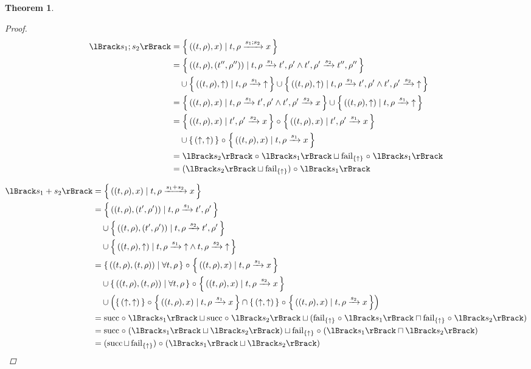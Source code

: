 \documentclass{article}
\newtheorem{theorem}{Theorem}
\newcommand{\fail}{\ensuremath \text{$\uparrow$}}
\newcommand{\seq}[2]{\ensuremath #1 ; #2}
\newcommand{\choice}[2]{\ensuremath #1 + #2}
\newcommand{\transform}[5]{#1, #2 \xrightarrow{#3} #4, #5}
\newcommand{\transformx}[4]{#1, #2 \xrightarrow{#3} #4}
\newcommand{\transformfail}[3]{#1, #2 \xrightarrow{#3} \fail}
\newcommand{\sem}[1]{\ensuremath \lBrack #1 \rBrack}
\newcommand{\setbuild}[2]{\ensuremath \left\{\, #1 \mid #2 \,\right\}}
\newcommand{\setbuildc}[1]{\ensuremath \left\{\, #1 \,\right\}}
\newcommand{\lfail}{\ensuremath \operatorname{fail}}
\newcommand{\lsucc}{\ensuremath \operatorname{succ}}
\newcommand{\comp}{\ensuremath \mathrel{\circ}}
\begin{document}
\begin{theorem}
\begin{proof}
\begin{align*}
  \sem{\seq{s_1}{s_2}}
    &= \setbuild{((t,\rho),x)}{\transformx{t}{\rho}{\seq{s_1}{s_2}}{x}} \\
    &= \setbuild{((t,\rho),(t'',\rho''))}{\transform{t}{\rho}{s_1}{t'}{\rho'} \land \transform{t'}{\rho'}{s_2}{t''}{\rho''}}\\
    &\quad \cup \setbuild{((t,\rho),\fail)}{\transformfail{t}{\rho}{s_1}} \cup \setbuild{((t,\rho),\fail)}{\transform{t}{\rho}{s_1}{t'}{\rho'} \land \transformfail{t'}{\rho'}{s_2}} \\
    &= \setbuild{((t,\rho),x)}{\transform{t}{\rho}{s_1}{t'}{\rho'} \land \transformx{t'}{\rho'}{s_2}{x}} \cup \setbuild{((t,\rho),\fail)}{\transformfail{t}{\rho}{s_1}} \\
    &= \setbuild{((t,\rho),x)}{\transformx{t'}{\rho'}{s_2}{x}} \comp \setbuild{((t,\rho),x)}{\transformx{t'}{\rho'}{s_1}{x}} \\
    &\quad \cup \setbuildc{(\fail,\fail)} \comp \setbuild{((t,\rho),x)}{\transformx{t}{\rho}{s_1}{x}} \\
    &= \sem{s_2} \comp \sem{s_1} \sqcup \lfail_{\{\fail\}} \comp \sem{s_1} \\
    &= (\sem{s_2} \sqcup \lfail_{\{\fail\}}) \comp \sem{s_1}
\end{align*}

\begin{align*}
  \sem{\choice{s_1}{s_2}}
     &= {\setbuild{((t,\rho),x)}{\transformx{t}{\rho}{\choice{s_1}{s_2}}{x}}} \\
     &= {\setbuild{((t,\rho),(t',\rho'))}{\transform{t}{\rho}{s_1}{t'}{\rho'}}} \\
     &\quad \cup {\setbuild{((t,\rho),(t',\rho'))}{\transform{t}{\rho}{s_2}{t'}{\rho'}}} \\
     &\quad \cup {\setbuild{((t,\rho),\fail)}{\transformfail{t}{\rho}{s_1} \land \transformfail{t}{\rho}{s_2}}} \\
     &= {\setbuild{((t,\rho),(t,\rho))}{\forall t, \rho}} \comp {\setbuild{((t,\rho),x)}{\transformx{t}{\rho}{s_1}{x}}} \\
     &\quad \cup {\setbuild{((t,\rho),(t,\rho))}{\forall t, \rho}} \comp {\setbuild{((t,\rho),x)}{\transformx{t}{\rho}{s_2}{x}}} \\
     &\quad \cup \left(\setbuildc{(\fail,\fail)} \comp {\setbuild{((t,\rho),x)}{\transformx{t}{\rho}{s_1}{x}}}\cap \setbuildc{(\fail,\fail)} \comp {\setbuild{((t,\rho),x)}{\transformx{t}{\rho}{s_2}{x}}} \right) \\
     &= \lsucc \comp \sem{s_1} \sqcup \lsucc \comp \sem{s_2} \sqcup (\lfail_{\{\fail\}} \comp \sem{s_1} \sqcap \lfail_{\{\fail\}} \comp \sem{s_2}) \\
     &= \lsucc \comp (\sem{s_1} \sqcup \sem{s_2}) \sqcup \lfail_{\{\fail\}} \comp (\sem{s_1} \sqcap \sem{s_2}) \\
     &= (\lsucc \sqcup \lfail_{\{\fail\}}) \comp (\sem{s_1} \sqcup \sem{s_2})
\end{align*}


\end{proof}
\end{theorem}
\end{document}
